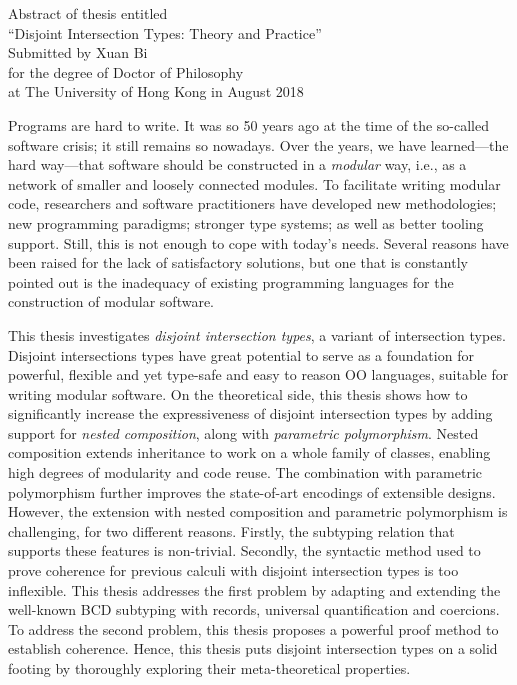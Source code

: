 
\begin{center}
\begin{large}
  Abstract of thesis entitled \\
  ``Disjoint Intersection Types: Theory and Practice'' \\
  Submitted by Xuan Bi \\
  for the degree of Doctor of Philosophy \\
  at The University of Hong Kong in August 2018
\end{large}
\end{center}


Programs are hard to write. It was so 50 years ago at the time of the so-called
software crisis; it still remains so nowadays. Over the years, we have
learned---the hard way---that software should be constructed in a
\textit{modular} way, i.e., as a network of smaller and loosely connected
modules. To facilitate writing modular code, researchers and software
practitioners have developed new methodologies; new programming paradigms;
stronger type systems; as well as better tooling support. Still, this is not
enough to cope with today's needs. Several reasons have been raised for the lack
of satisfactory solutions, but one that is constantly pointed out is the
inadequacy of existing programming languages for the construction of
modular software.

This thesis investigates \textit{disjoint intersection types}, a variant of
intersection types. Disjoint intersections types have great potential to serve
as a foundation for powerful, flexible and yet type-safe and easy to reason OO
languages, suitable for writing modular software. On the theoretical side, this
thesis shows how to significantly increase the expressiveness of disjoint
intersection types by adding support for \textit{nested composition}, along with
\textit{parametric polymorphism}. Nested composition extends inheritance to work
on a whole family of classes, enabling high degrees of modularity and code
reuse. The combination with parametric polymorphism further improves the
state-of-art encodings of extensible designs. However, the extension with nested
composition and parametric polymorphism is challenging, for two different
reasons. Firstly, the subtyping relation that supports these features is
non-trivial. Secondly, the syntactic method used to prove coherence for previous
calculi with disjoint intersection types is too inflexible. This thesis
addresses the first problem by adapting and extending the well-known BCD
subtyping with records, universal quantification and coercions. To address the
second problem, this thesis proposes a powerful proof method to establish
coherence. Hence, this thesis puts disjoint intersection types on a solid
footing by thoroughly exploring their meta-theoretical properties.

